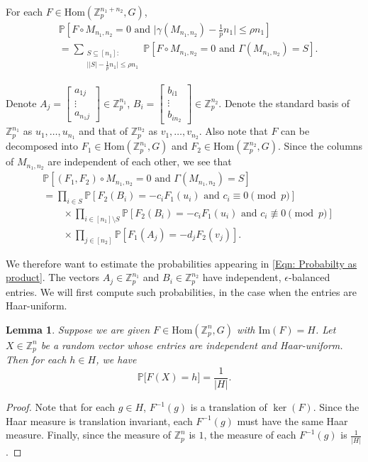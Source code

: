 \documentclass[12pt]{amsart}
\newtheorem{lemma}[theorem]{Lemma}
\theoremstyle{definition}
\newcommand{\PPP}{\mathbb{P}}
\newcommand{\Mnot}{M_{n_1,n_2}}
\newcommand{\abs}[1]{\vert#1\vert}
\newcommand{\im}{\text{Im}}
\newcommand{\Zpnot}{\Z_p^{n_1+n_2}}
\newcommand{\Zp}{\Z_p}
\newcommand{\Z}{\mathbb{Z}}
\newcommand{\Hom}{\text{Hom}}
\begin{document}
For each $F\in\Hom(\Zpnot,G)$,
\begin{equation}\label{Eqn: Probabilty as sum over S}
\begin{split}
&\PPP[F\circ \Mnot=0 \text{ and } \abs{\gamma(\Mnot) -\tfrac{1}{p} n_1}\leq \rho n_1]\\
&=
\sum_{\substack{S\subseteq [n_1]:\\ \abs{\abs{S} -\frac{1}{p}n_1}\leq \rho n_1}}
\PPP[F\circ \Mnot=0 \text{ and } \Gamma(\Mnot)=S].   
\end{split}
\end{equation}

Denote $A_j=\begin{bmatrix}
a_{1j}\\ \vdots \\ a_{n_1j}
\end{bmatrix}\in \Zp^{n_1}$,
$B_i=\begin{bmatrix}
b_{i1}\\ \vdots \\ b_{in_2}
\end{bmatrix}\in \Zp^{n_2}$.
Denote the standard basis of $\Zp^{n_1}$ as $u_1,\dots,u_{n_1}$ and that of $\Zp^{n_2}$ as $v_1,\dots, v_{n_2}$.
Also note that $F$ can be decomposed into $F_1\in\Hom(\Zp^{n_1},G)$ and $F_2\in\Hom(\Zp^{n_2},G)$.
Since the columns of $\Mnot$ are independent of each other, we see that
\begin{equation}\label{Eqn: Probabilty as product}
\begin{split}
&\PPP[(F_1,F_2)\circ \Mnot=0 \text{ and }\Gamma(\Mnot)=S]\\
&=\prod_{i\in S} 
\PPP[ F_2(B_i)=-c_iF_1(u_i) \text{ and } c_i\equiv 0\pmod{p}]\\
&\quad\quad\times
\prod_{i\in [n_1]\setminus S} 
\PPP[F_2(B_i)=-c_iF_1(u_i)
\text{ and } c_i\not\equiv 0\pmod{p}]\\
&\quad\quad\times
\prod_{j\in [n_2]} 
\PPP[F_1(A_j)=-d_jF_2(v_j)].
\end{split}
\end{equation}

We therefore want to estimate the probabilities appearing in \eqref{Eqn: Probabilty as product}. The vectors $A_j\in \Zp^{n_1}$ and $B_i\in \Zp^{n_2}$ have independent, $\epsilon$-balanced entries. We will first compute such probabilities, in the case when the entries are Haar-uniform.

\begin{lemma}\label{Lem: Haar uniform}
Suppose we are given $F\in \Hom(\Zp^n,G)$ with $\im(F)=H$. Let $X\in \Zp^n$ be a random vector whose entries are independent and Haar-uniform. 
Then for each $h\in H$, we have
\[
\PPP\big[F(X)= h\big]
=\frac{1}{\abs{H}}.
\]
\end{lemma}
\begin{proof}
Note that for each $g\in H$, $F^{-1}(g)$ is a translation of $\ker(F)$. Since the Haar measure is translation invariant, each $F^{-1}(g)$ must have the same Haar measure. Finally, since the measure of $\Zp^n$ is $1$, the measure of each $F^{-1}(g)$ is $\frac{1}{\abs{H}}$.
\end{proof}
\end{document}
